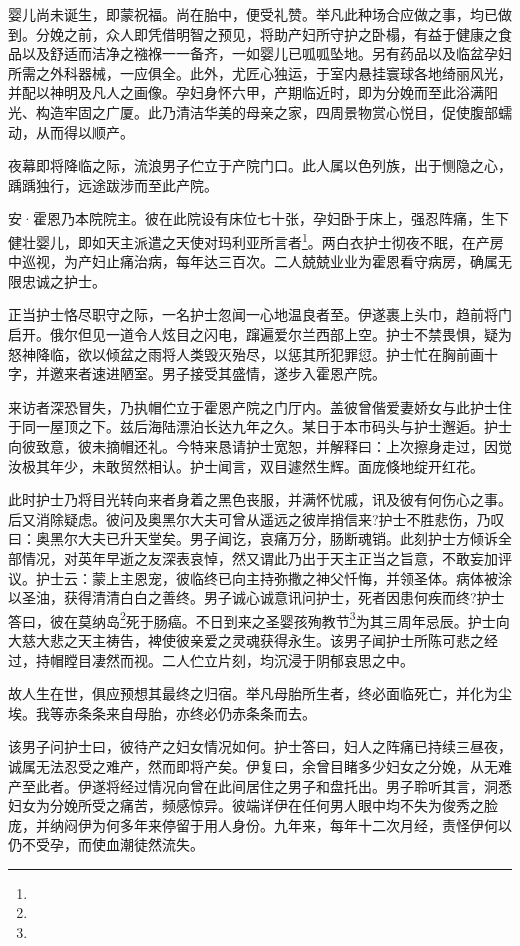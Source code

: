 \par 婴儿尚未诞生，即蒙祝福。尚在胎中，便受礼赞。举凡此种场合应做之事，均已做到。分娩之前，众人即凭借明智之预见，将助产妇所守护之卧榻，有益于健康之食品以及舒适而洁净之襁褓一一备齐，一如婴儿已呱呱坠地。另有药品以及临盆孕妇所需之外科器械，一应俱全。此外，尤匠心独运，于室内悬挂寰球各地绮丽风光，并配以神明及凡人之画像。孕妇身怀六甲，产期临近时，即为分娩而至此浴满阳光、构造牢固之广厦。此乃清洁华美的母亲之家，四周景物赏心悦目，促使腹部蠕动，从而得以顺产。
\par 夜幕即将降临之际，流浪男子伫立于产院门口。此人属以色列族，出于恻隐之心，踽踽独行，远途跋涉而至此产院。
\par 安·霍恩乃本院院主。彼在此院设有床位七十张，孕妇卧于床上，强忍阵痛，生下健壮婴儿，即如天主派遣之天使对玛利亚所言者\footnote{}。两白衣护士彻夜不眠，在产房中巡视，为产妇止痛治病，每年达三百次。二人兢兢业业为霍恩看守病房，确属无限忠诚之护士。
\par 正当护士恪尽职守之际，一名护士忽闻一心地温良者至。伊遂裹上头巾，趋前将门启开。俄尔但见一道令人炫目之闪电，蹿遍爱尔兰西部上空。护士不禁畏惧，疑为怒神降临，欲以倾盆之雨将人类毁灭殆尽，以惩其所犯罪愆。护士忙在胸前画十字，并邀来者速进陋室。男子接受其盛情，遂步入霍恩产院。
\par 来访者深恐冒失，乃执帽伫立于霍恩产院之门厅内。盖彼曾偕爱妻娇女与此护士住于同一屋顶之下。兹后海陆漂泊长达九年之久。某日于本市码头与护士邂逅。护士向彼致意，彼未摘帽还礼。今特来恳请护士宽恕，并解释曰：上次擦身走过，因觉汝极其年少，未敢贸然相认。护士闻言，双目遽然生辉。面庞倏地绽开红花。
\par 此时护士乃将目光转向来者身着之黑色丧服，并满怀忧戚，讯及彼有何伤心之事。后又消除疑虑。彼问及奥黑尔大夫可曾从遥远之彼岸捎信来?护士不胜悲伤，乃叹曰：奥黑尔大夫已升天堂矣。男子闻讫，哀痛万分，肠断魂销。此刻护士方倾诉全部情况，对英年早逝之友深表哀悼，然又谓此乃出于天主正当之旨意，不敢妄加评议。护士云：蒙上主恩宠，彼临终已向主持弥撒之神父忏悔，并领圣体。病体被涂以圣油，获得清清白白之善终。男子诚心诚意讯问护士，死者因患何疾而终?护士答曰，彼在莫纳岛\footnote{}死于肠癌。不日到来之圣婴孩殉教节\footnote{}为其三周年忌辰。护士向大慈大悲之天主祷告，裨使彼亲爱之灵魂获得永生。该男子闻护士所陈可悲之经过，持帽瞠目凄然而视。二人伫立片刻，均沉浸于阴郁哀思之中。
\par 故人生在世，俱应预想其最终之归宿。举凡母胎所生者，终必面临死亡，并化为尘埃。我等赤条条来自母胎，亦终必仍赤条条而去。
\par 该男子问护士曰，彼待产之妇女情况如何。护士答曰，妇人之阵痛已持续三昼夜，诚属无法忍受之难产，然而即将产矣。伊复曰，余曾目睹多少妇女之分娩，从无难产至此者。伊遂将经过情况向曾在此间居住之男子和盘托出。男子聆听其言，洞悉妇女为分娩所受之痛苦，频感惊异。彼端详伊在任何男人眼中均不失为俊秀之脸庞，并纳闷伊为何多年来停留于用人身份。九年来，每年十二次月经，责怪伊何以仍不受孕，而使血潮徒然流失。
